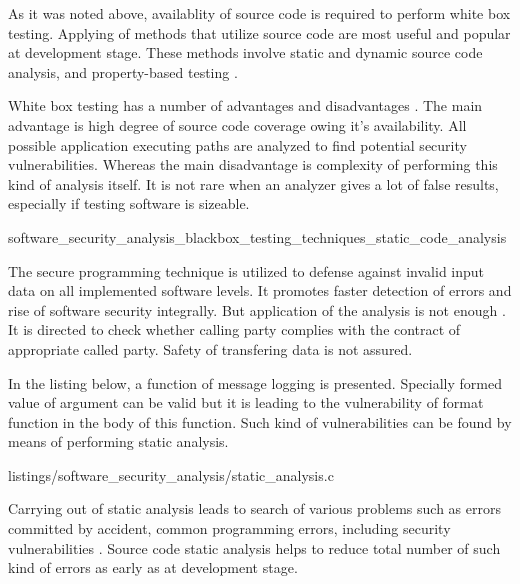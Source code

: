 %
As it was noted above, availablity of source code is required to perform white box testing. 
%
Applying of methods that utilize source code are most useful and popular at development stage. 
%
These methods involve static and dynamic source code analysis, and property-based testing . 

%
White box testing has a number of advantages and disadvantages . 
%
The main advantage is \A high degree of source code coverage owing it's availability. 
%
All possible application executing paths are analyzed to find potential security vulnerabilities. 
%
Whereas the main disadvantage is complexity of performing this kind of analysis itself. 
%
It is not rare when an analyzer gives a lot of false results, especially if testing software is sizeable. 


	{software_security_analysis_blackbox_testing_techniques_static_code_analysis}

%
The secure programming technique  is utilized to defense against invalid input data on all implemented software levels. 
%
It promotes faster detection of errors and rise of software security integrally. 
%
But application of the analysis is not enough . 
%
It is directed to check whether calling party complies with the contract of appropriate called party. 
%
Safety of transfering data is not assured. 

%
In the listing below, a function of message logging is presented. 
%
Specially formed value of  argument can be valid but it is leading to the vulnerability of  format function in the body of this function. 
%
Such kind of vulnerabilities can be found by means of performing static analysis. 

	{listings/software_security_analysis/static_analysis.c}

%
Carrying out of static analysis leads to search of various problems such as errors committed by accident, common programming errors, including security vulnerabilities . 
%
Source code static analysis helps to reduce total number of such kind of errors as early as at development stage. 

